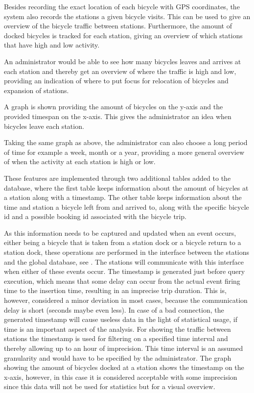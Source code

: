 Besides recording the exact location of each bicycle with GPS coordinates, the system also records the stations a given bicycle visits. 
This can be used to give an overview of the bicycle traffic between stations.
Furthermore, the amount of docked bicycles is tracked for each station, giving an overview of which stations that have high and low activity.

\begin{description}[style=nextline]
\item[Where is the most traffic of bicycles during some period?] An administrator would be able to see how many bicycles leaves and arrives at each station and thereby get an overview of where the traffic is high and low, providing an indication of where to put focus for relocation of bicycles and expansion of stations.
\item[What is the current amount of bicycles at a given station?] A graph is shown providing the amount of bicycles on the y-axis and the provided timespan on the x-axis. This gives the administrator an idea when bicycles leave each station.
\item[How does the amount of bicycles at a given station change over time?] Taking the same graph as above, the administrator can also choose a long period of time for example a week, month or a year, providing a more general overview of when the activity at each station is high or low.
\end{description}

These features are implemented through two additional tables added to the database, where the first table keeps information about the amount of bicycles at a station along with a timestamp. 
The other table keeps information about the time and station a bicycle left from and arrived to, along with the specific bicycle id and a possible booking id associated with the bicycle trip.

As this information needs to be captured and updated when an event occurs, either being a bicycle that is taken from a station dock or a bicycle return to a station dock, these operations are performed in the interface between the stations and the global database, see . 
The stations will communicate with this interface when either of these events occur. 
The timestamp is generated just before query execution, which means that some delay can occur from the actual event firing time to the insertion time, resulting in an imprecise trip duration. 
This is, however, considered a minor deviation in most cases, because the communication delay is short (seconds maybe even less).
In case of a bad connection, the generated timestamp will cause useless data in the light of statistical usage, if time is an important aspect of the analysis.
For showing the traffic between stations the timestamp is used for filtering on a specified time interval and thereby allowing up to an hour of imprecision.
This time interval is an assumed granularity and would have to be specified by the administrator.
The graph showing the amount of bicycles docked at a station shows the timestamp on the x-axis, however, in this case it is considered acceptable with some imprecision since this data will not be used for statistics but for a visual overview.